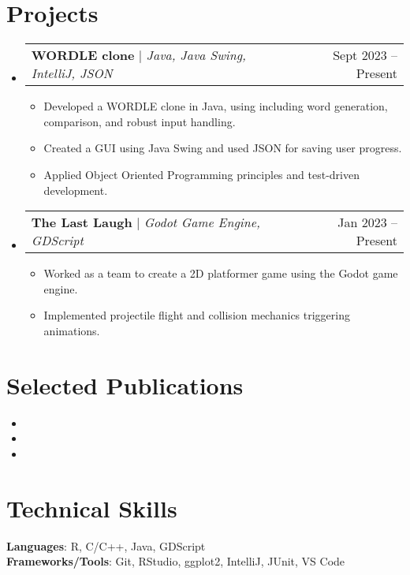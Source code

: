 \documentclass[letterpaper,11pt]{article}
\makeatletter
\newcommand{\resumeItem}[1]{
  \item\small{
    {#1 \vspace{-2pt}}
  }
}
\newcommand{\resumeProjectHeading}[2]{
    \item
    \begin{tabular*}{0.97\textwidth}{l@{\extracolsep{\fill}}r}
      \small#1 & #2 \\
    \end{tabular*}\vspace{-7pt}
}
\newcommand{\resumeSubHeadingListStart}{\begin{itemize}[leftmargin=0.15in, label={}]}
\newcommand{\resumeSubHeadingListEnd}{\end{itemize}}
\newcommand{\resumeItemListStart}{\begin{itemize}}
\newcommand{\resumeItemListEnd}{\end{itemize}\vspace{-5pt}}
\makeatother
\begin{document}



\section{Projects}
    \resumeSubHeadingListStart
      \resumeProjectHeading
          {\textbf{WORDLE clone} $|$ \emph{Java, Java Swing, IntelliJ, JSON}}{Sept 2023 -- Present}
          \resumeItemListStart
            \resumeItem{Developed a WORDLE clone in Java, using including word generation, comparison, and robust input handling.}
            \resumeItem{Created a GUI using Java Swing and used JSON for saving user progress.}
            \resumeItem{Applied Object Oriented Programming principles and test-driven development.}

          \resumeItemListEnd

                  
      \resumeProjectHeading
          {\textbf{The Last Laugh} $|$ \emph{Godot Game Engine, GDScript}}{Jan 2023 -- Present}
          \resumeItemListStart
            \resumeItem{Worked as a team to create a 2D platformer game using the Godot game engine.}
            \resumeItem{Implemented projectile flight and collision mechanics triggering animations.}
          \resumeItemListEnd
    \resumeSubHeadingListEnd



\section*{Selected Publications}
\begin{itemize}[leftmargin=0.15in, label={}]
    \item{}
    \item{}
    \item{}
\end{itemize}



\section{Technical Skills}
 \begin{itemize}[leftmargin=0.15in, label={}]
    \small{\item{
     \textbf{Languages}{: R, C/C++, Java, GDScript} \\
     \textbf{Frameworks/Tools}{: Git, RStudio, ggplot2, IntelliJ, JUnit, VS Code} \\
    }}
 \end{itemize}
 


\end{document}
